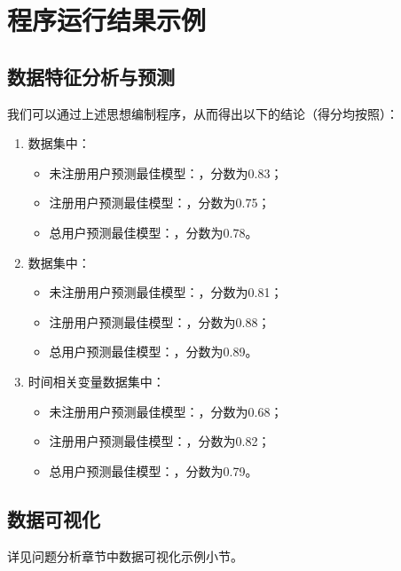 \section{程序运行结果示例}
\subsection{数据特征分析与预测}
我们可以通过上述思想编制程序，从而得出以下的结论（得分均按照）：
\begin{enumerate}
    \item {}数据集中：
        \begin{itemize}
            \item 未注册用户预测最佳模型：，分数为0.83；
            \item 注册用户预测最佳模型：，分数为0.75；
            \item 总用户预测最佳模型：，分数为0.78。
        \end{itemize}

    \item {}数据集中：
        \begin{itemize}
            \item 未注册用户预测最佳模型：，分数为0.81；
            \item 注册用户预测最佳模型：，分数为0.88；
            \item 总用户预测最佳模型：，分数为0.89。
        \end{itemize}

    \item 时间相关变量数据集中：
        \begin{itemize}
            \item 未注册用户预测最佳模型：，分数为0.68；
            \item 注册用户预测最佳模型：，分数为0.82；
            \item 总用户预测最佳模型：，分数为0.79。
        \end{itemize}
\end{enumerate}


\subsection{数据可视化}
详见问题分析章节中数据可视化示例小节。
